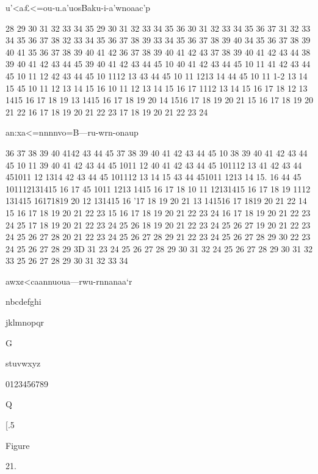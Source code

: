 u'<a£<=ou-u.a'uosBaku-i-a'wnoaac'p

28 29 30 31 32 33 34 35
29 30 31 32 33 34 35 36
30 31 32 33 34 35 36 37
31 32 33 34 35 36 37 38
32 33 34 35 36 37 38 39
33 34 35 36 37 38 39 40
34 35 36 37 38 39 40 41
35 36 37 38 39 40 41 42
36 37 38 39 40 41 42 43
37 38 39 40 41 42 43 44
38 39 40 41 42 43 44 45
39 40 41 42 43 44 45 10
40 41 42 43 44 45 10 11
41 42 43 44 45 10 11 12
42 43 44 45 10 1112 13
43 44 45 10 11 1213 14
44 45 10 11 1-2 13 14 15
45 10 11 12 13 14 15 16
10 11 12 13 14 15 16 17
1112 13 14 15 16 17 18
12 13 1415 16 17 18 19
13 1415 16 17 18 19 20
14 1516 17 18 19 20 21
15 16 17 18 19 20 21 22
16 17 18 19 20 21 22 23
17 18 19 20 21 22 23 24

an:xa<=nnnnvo=B—ru-wrn-onaup

36 37 38 39 40 4142 43 44 45
37 38 39 40 41 42 43 44 45 10
38 39 40 41 42 43 44 45 10 11
39 40 41 42 43 44 45 1011 12
40 41 42 43 44 45 101112 13
41 42 43 44 451011 12 1314
42 43 44 45 101112 13 14 15
43 44 451011 1213 14 15. 16
44 45 101112131415 16 17
45 1011 1213 1415 16 17 18
10 11 12131415 16 17 18 19
1112 131415 16171819 20
12 131415 16 '17 18 19 20 21
13 141516 17 1819 20 21 22
14 15 16 17 18 19 20 21 22 23
15 16 17 18 19 20 21 22 23 24
16 17 18 19 20 21 22 23 24 25
17 18 19 20 21 22 23 24 25 26
18 19 20 21 22 23 24 25 26 27
19 20 21 22 23 24 25 26 27 28
20 21 22 23 24 25 26 27 28 29
21 22 23 24 25 26 27 28 29 30
22 23 24 25 26 27 28 29 3D 31
23 24 25 26 27 28 29 30 31 32
24 25 26 27 28 29 30 31 32 33
25 26 27 28 29 30 31 32 33 34

awx¢<caannuoua—rwu-rnnanaa‘r

 

 

 

nbcdefghi

 

 

jklmnopqr

 

G

 

 

stuvwxyz

 

0123456789

 

Q

 

 

[.5

Figure

21.


